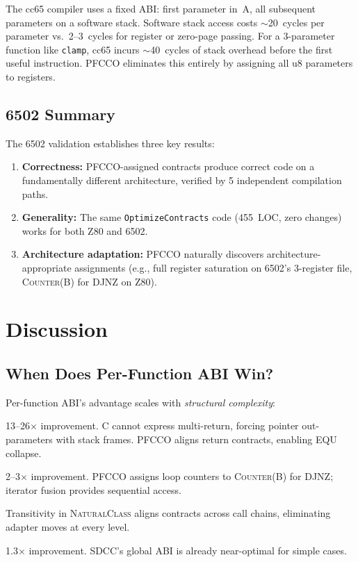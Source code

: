 \documentclass[sigplan,screen,nonacm]{acmart}
\begin{document}
The cc65 compiler uses a fixed ABI: first parameter in~A, all subsequent
parameters on a software stack.  Software stack access costs
$\sim$20~cycles per parameter vs.\ 2--3~cycles for register or zero-page
passing.  For a 3-parameter function like \texttt{clamp}, cc65 incurs
$\sim$40~cycles of stack overhead before the first useful instruction.
PFCCO eliminates this entirely by assigning all u8 parameters to registers.

\subsection{6502 Summary}

The 6502 validation establishes three key results:

\begin{enumerate}
\item \textbf{Correctness:} PFCCO-assigned contracts produce correct code
  on a fundamentally different architecture, verified by 5 independent
  compilation paths.
\item \textbf{Generality:} The same \texttt{OptimizeContracts} code
  (455~LOC, zero changes) works for both Z80 and 6502.
\item \textbf{Architecture adaptation:} PFCCO naturally discovers
  architecture-appropriate assignments (e.g., full register saturation
  on 6502's 3-register file, \textsc{Counter}(B) for DJNZ on Z80).
\end{enumerate}

\section{Discussion}
\label{sec:discussion}

\subsection{When Does Per-Function ABI Win?}

Per-function ABI's advantage scales with \emph{structural complexity}:

\begin{description}[style=unboxed]
\item[Multi-return functions:] 13--26$\times$ improvement.  C cannot express
  multi-return, forcing pointer out-parameters with stack frames.  PFCCO
  aligns return contracts, enabling EQU collapse.
\item[Iterator/lambda chains:] 2--3$\times$ improvement.  PFCCO assigns
  loop counters to \textsc{Counter}(B) for DJNZ; iterator fusion provides
  sequential access.
\item[Deep call graphs:] Transitivity in \textsc{NaturalClass} aligns
  contracts across call chains, eliminating adapter moves at every level.
\item[Leaf arithmetic:] 1.3$\times$ improvement.  SDCC's global ABI is
  already near-optimal for simple cases.
\end{description}
\end{document}
